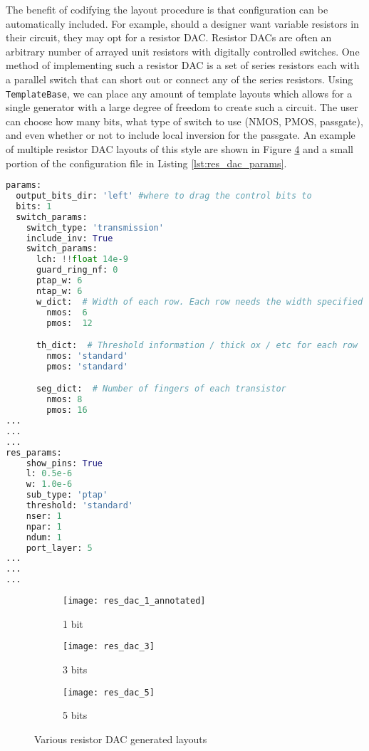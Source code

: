 The benefit of codifying the layout procedure is that configuration can be automatically included. For example, should a designer want variable resistors in their circuit, they may opt for a resistor DAC. Resistor DACs are often an arbitrary number of arrayed unit resistors with digitally controlled switches. One method of implementing such a resistor DAC is a set of series resistors each with a parallel switch that can short out or connect any of the series resistors. Using \texttt{TemplateBase}, we can place any amount of template layouts which allows for a single generator with a large degree of freedom to create such a circuit. The user can choose how many bits, what type of switch to use (NMOS, PMOS, passgate), and even whether or not to include local inversion for the passgate. An example of multiple resistor DAC layouts of this style are shown in Figure \ref{fig:dac} and a small portion of the configuration file in Listing \ref{lst:res_dac_params}.
\begin{lstlisting}[language=Python, caption=Resistor DAC params sample, label={lst:res_dac_params}, float]
params:
  output_bits_dir: 'left' #where to drag the control bits to
  bits: 1
  switch_params:
    switch_type: 'transmission'
    include_inv: True
    switch_params:
      lch: !!float 14e-9
      guard_ring_nf: 0
      ptap_w: 6
      ntap_w: 6
      w_dict:  # Width of each row. Each row needs the width specified
        nmos:  6
        pmos:  12

      th_dict:  # Threshold information / thick ox / etc for each row
        nmos: 'standard'
        pmos: 'standard'

      seg_dict:  # Number of fingers of each transistor
        nmos: 8
        pmos: 16
...
...
...
res_params:
    show_pins: True
    l: 0.5e-6
    w: 1.0e-6
    sub_type: 'ptap'
    threshold: 'standard'
    nser: 1
    npar: 1
    ndum: 1
    port_layer: 5
...
...
...
\end{lstlisting}
\clearpage
\begin{figure}[h]
\centering
\begin{subfigure}{1\linewidth}
  \centering
  \texttt{[image: res\_dac\_1\_annotated]}
  \caption{1 bit}
  \label{fig:sfig1}
\end{subfigure}
\begin{subfigure}{.4\linewidth}
  \centering
\texttt{[image: res\_dac\_3]}
  \caption{3 bits}
  \label{fig:sfig2}
\end{subfigure}
\begin{subfigure}{.5\linewidth}
  \centering
\texttt{[image: res\_dac\_5]}
  \caption{5 bits}
  \label{fig:sfig2}
\end{subfigure}
\caption{Various resistor DAC generated layouts}
\label{fig:dac}
\end{figure}
\clearpage
